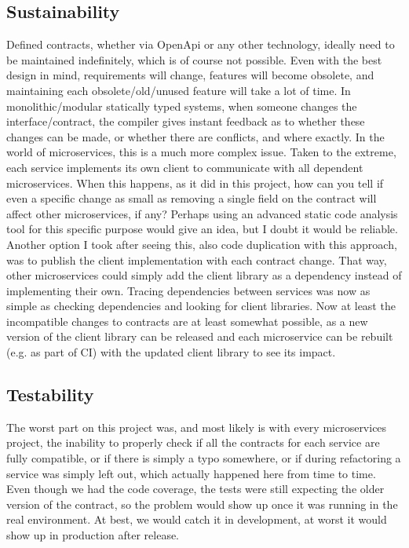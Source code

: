 \subsection{Sustainability}
Defined contracts, whether via OpenApi or any other technology, ideally need to be maintained indefinitely, which is of course not possible. Even with the best design in mind, requirements will change, features will become obsolete, and maintaining each obsolete/old/unused feature will take a lot of time. In monolithic/modular statically typed systems, when someone changes the interface/contract, the compiler gives instant feedback as to whether these changes can be made, or whether there are conflicts, and where exactly. In the world of microservices, this is a much more complex issue. Taken to the extreme, each service implements its own client to communicate with all dependent microservices. When this happens, as it did in this project, how can you tell if even a specific change as small as removing a single field on the contract will affect other microservices, if any? Perhaps using an advanced static code analysis tool for this specific purpose would give an idea, but I doubt it would be reliable. Another option I took after seeing this, also code duplication with this approach, was to publish the client implementation with each contract change. That way, other microservices could simply add the client library as a dependency instead of implementing their own. Tracing dependencies between services was now as simple as checking dependencies and looking for client libraries. Now at least the incompatible changes to contracts are at least somewhat possible, as a new version of the client library can be released and each microservice can be rebuilt (e.g. as part of CI) with the updated client library to see its impact.

\subsection{Testability}
The worst part on this project was, and most likely is with every microservices project, the inability to properly check if all the contracts for each service are fully compatible, or if there is simply a typo somewhere, or if during refactoring a service was simply left out, which actually happened here from time to time. Even though we had the code coverage, the tests were still expecting the older version of the contract, so the problem would show up once it was running in the real environment. At best, we would catch it in development, at worst it would show up in production after release.

